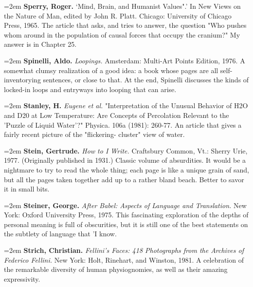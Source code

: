\par\noindent\hangindent=2em {\bf Sperry, Roger.} `Mind, Brain, and Humanist Values".' In New Views on the Nature of Man, edited by John R. Platt. Chicago: University of Chicago Press, 1965. The article that asks, and tries to answer, the question "Who pushes whom around in the population of causal forces that occupy the cranium?" My answer is in Chapter 25.

\par\noindent\hangindent=2em {\bf Spinelli, Aldo.} {\it Loopings.} Amsterdam: Multi-Art Points Edition, 1976. A somewhat clumsy realization of a good idea: a book whose pages are all self-inventorying sentences, or close to that. At the end, Spinelli discusses the kinds of locked-in loops and entryways into looping that can arise.

\par\noindent\hangindent=2em {\bf Stanley, H.} {\it Eugene et al.} "Interpretation of the Unusual Behavior of H2O and D20 at Low Temperature: Are Concepts of Percolation Relevant to the 'Puzzle of Liquid Water'?" Physica. 106a (1981): 260-77. An article that gives a fairly recent picture of the "flickering- cluster" view of water.

\par\noindent\hangindent=2em {\bf Stein, Gertrude.} {\it How to I Write.} Craftsbury Common, Vt.: Sherry Urie, 1977. (Originally published in 1931.) Classic volume of absurdities. It would be a nightmare to try to read the whole thing; each page is like a unique grain of sand, but all the pages taken together add up to a rather bland beach. Better to savor it in small bits.

\par\noindent\hangindent=2em {\bf Steiner, George.} {\it After Babel: Aspects of Language and Translation.} New York: Oxford University Press, 1975. This fascinating exploration of the depths of personal meaning is full of obscurities, but it is still one of the best statements on the subtlety of language that 'I know.

\par\noindent\hangindent=2em {\bf Strich, Christian.} {\it Fellini's Faces: 418 Photographs from the Archives of Federico Fellini.} New York: Holt, Rinehart, and Winston, 1981. A celebration of the remarkable diversity of human physiognomies, as well as their amazing expressivity.


